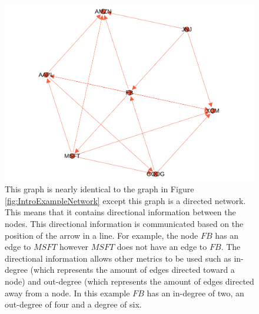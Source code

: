 \begin{figure}[!htb]
    \centering
     \includegraphics[width=\textwidth]{figures/Intro/ExampleNetworkDirected.pdf}
    \caption{
This graph is nearly identical to the graph in Figure \ref{fig:IntroExampleNetwork} except this graph is a directed network. This means that it contains directional information between the nodes. This directional information is communicated based on the position of the arrow in a line. For example, the node \(FB\) has an edge to \(MSFT\) however \(MSFT\) does not have an edge to \(FB\). The directional information allows other metrics to be used such as in-degree (which represents the amount of edges directed toward a node) and out-degree (which represents the amount of edges directed away from a node. In this example \(FB\) has an in-degree of two, an out-degree of four and a degree of six.
      }
	\label{fig:ExampleNetworkDirected}
\end{figure}



